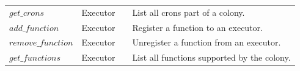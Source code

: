 \documentclass{article}
\begin{document}
\begin{table}[h]
\begin{tabular}{llcl}
        \(get\_crons\)             & Executor     &            & List all crons part of a colony.\\
        \(add\_function\)          & Executor     &            & Register a function to an executor. \\
        \(remove\_function\)       & Executor     &            & Unregister a function from an executor. \\
        \(get\_functions\)         & Executor     &            & List all functions supported by the colony. \\
		\bottomrule
	\end{tabular}
	\label{optable}
\end{table}
\end{document}
